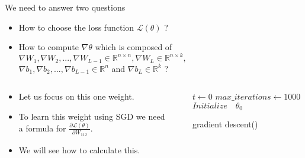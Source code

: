 \savestack{\figuretwo}{}
\savestack{\figurethree}{}

\begin{frame}
\end{frame}

\begin{frame}
  \begin{block}{We need to answer two questions}
    \begin{itemize}
      \item How to choose the loss function $\mathscr{L}(\theta)$ ?
      \item \alert<2->{How to compute $\nabla \theta$ which is composed of $\nabla W_1, \nabla W_2, ..., \nabla W_{L-1} \in \mathbb{R}^{n \times n}, \nabla W_{L} \in \mathbb{R}^{n \times k},$ \\ $\nabla b_1, \nabla b_2, ..., \nabla b_{L-1} \in \mathbb{R}^n $ and $\nabla b_{L} \in \mathbb{R}^k$ ?}
    \end{itemize}
  \end{block}
\end{frame}

\begin{frame}
  \begin{columns}
    \begin{overlayarea}{\textwidth}{\textheight}
      \begin{itemize}
        \item<1-> Let us focus on this one weight.
        \item<2-> To learn this weight using SGD we need a formula for $\frac{\partial \mathscr{L}(\theta)}{ \partial W_{112}}$.
        \item<3-> We will see how to calculate this.
      \end{itemize}
    \end{overlayarea}


    \begin{overlayarea}{\textwidth}{\textheight}
      \makebox[\textwidth][c]{\usebox{\figuretwocontent}}
    \end{overlayarea}

    \begin{overlayarea}{\textwidth}{\textheight}
      \begin{algorithm}[H]
        \SetAlgoLined
        $t \leftarrow 0$\;
        $max\_iterations\leftarrow 1000$\;
        $Initialize \quad \theta_0$\;
        \color{black}
        \caption{gradient descent()}
      \end{algorithm}
    \end{overlayarea}
  \end{columns}
\end{frame}

